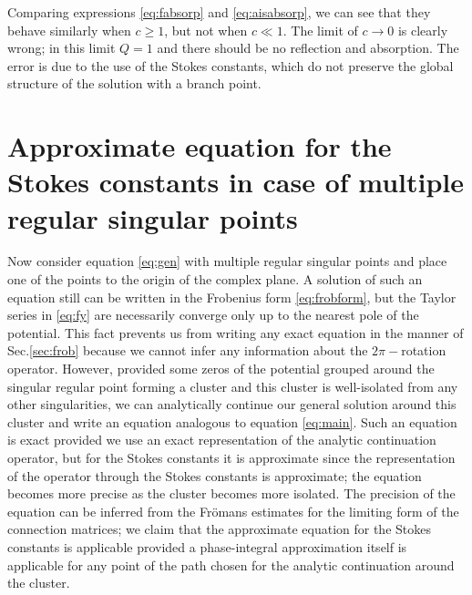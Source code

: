 \documentclass[aip,jmp,reprint]{revtex4-1}
\begin{document}
Comparing expressions \eqref{eq:fabsorp} and \eqref{eq:aisabsorp}, we can see that 
they behave similarly when $c \geq 1$, 
but not when $c \ll 1$. The limit of $c\rightarrow 0$ is clearly wrong; in this limit $Q=1$
and there should be no reflection and absorption. The error is due to the use of the Stokes constants, 
which do not preserve the global structure of the solution with a branch point. 

\section{Approximate equation for the Stokes constants in case of multiple regular singular points \label{sec:approx}}

Now consider equation \eqref{eq:gen} with multiple regular singular points and place one of the points
to the origin of the complex plane. A solution of such an equation still can be written in
the Frobenius form \eqref{eq:frobform}, but the Taylor series in \eqref{eq:fy}
are necessarily converge only up to the nearest pole of the potential\cite{cbbook}. This fact
prevents us from writing any exact equation in the manner of Sec.\ref{sec:frob} because
we cannot infer any information about the $2\pi-$rotation operator. However, provided some
zeros of the potential grouped around the singular regular point forming a cluster and this cluster is
well-isolated from any other singularities, we can analytically continue our general solution
around this cluster and write an equation analogous to equation \eqref{eq:main}. Such an equation
is exact provided we use an exact representation of the analytic continuation operator, but
for the Stokes constants it is approximate since the representation of the operator
through the Stokes constants is approximate; the equation becomes more precise as the cluster
becomes more isolated. The precision of the equation can be inferred from the Fr\"omans estimates 
for the limiting form of the connection matrices\cite{frbook}; we claim that the approximate equation 
for the Stokes constants is applicable provided a phase-integral approximation itself is applicable 
for any point of the path chosen for the analytic continuation around the cluster.
 
\end{document}
